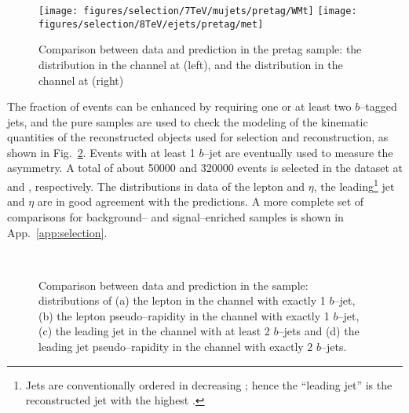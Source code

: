 \begin{figure}\centering
  \texttt{[image: figures/selection/7TeV/mujets/pretag/WMt]}
  \texttt{[image: figures/selection/8TeV/ejets/pretag/met]}
  \caption{
    Comparison between data and prediction in the pretag sample: the
    \mtw{} distribution in the \mujets{} channel at \seventev{}
    (left), and the \met{} distribution in the \ejets{} channel at
    \eighttev{} (right)}
  \label{fig:pretagdatamc}
\end{figure}

The fraction of \ttbar{} events can be enhanced by requiring one or
at least two $b$--tagged jets, and the pure samples are used to check the
modeling of the kinematic quantities of the reconstructed
objects used for selection and reconstruction, as shown in
Fig.~\ref{fig:taggeddatamc}. Events with at least 1 $b$--jet are
eventually used to measure the asymmetry. A total of about 50000 and
320000 \ttbar{} events is selected in the dataset at \seventev{} and
\eighttev{}, respectively.
The distributions in data of the lepton \pt{} and $\eta$, the
leading\footnote{Jets are conventionally ordered in decreasing \pt{};
  hence the ``leading jet'' is the reconstructed jet with the highest
  \pt{}.} jet \pt{} and $\eta$ are in good agreement with the
predictions. A more complete set of comparisons for background-- and
signal--enriched samples is shown in App.~\ref{app:selection}.

\begin{figure}\centering
  \quad
  \\
  \quad
  \caption{
    Comparison between data and prediction in the \eighttev{} sample:
    distributions of (a) the lepton \pt{} in the \mujets{} channel with
    exactly 1 $b$--jet, (b) the lepton pseudo--rapidity in the \ejets{}
    channel with exactly 1 $b$--jet, (c) the leading jet \pt{} in the
    \mujets{} channel with at least 2 $b$--jets and (d) the leading
    jet pseudo--rapidity in the \ejets{} channel with exactly 2
    $b$--jets.
}
  \label{fig:taggeddatamc}
\end{figure}

